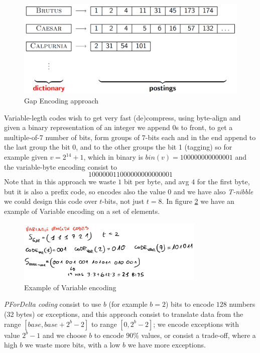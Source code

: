 \begin{figure}
	\includegraphics[width=\textwidth]{Images/gapEncoding}
	\caption{Gap Encoding approach}
	\label{img:gapEncoding}
\end{figure}
Variable-legth codes wish to get very fast (de)compress, 
using byte-align and given a binary representation of an integer
we append $0$s to front, to get a multiple-of-7 number of bits,
form groups of $7$-bits each and in the end append to the last group
the bit 0, and to the other groups the bit 1 (tagging) so for 
example given $v=2^{14} + 1$, which in binary is $bin(v) = 100000000000001$
and the variable-byte encoding consist to 
\[ 10000001 10000000 00000001 \]
Note that in this approach we waste $1$ bit per byte, and avg $4$
for the first byte, but it is also a prefix code, so encodes
also the value $0$ and we have also \emph{T-nibble} we could design
this code over $t$-bits, not just $t = 8$.\newline
In figure \ref{img:variable} we have an example of Variable encoding on a set of elements.

\begin{figure}
	\includegraphics[width=0.8\textwidth]{Images/variableCode}
	\caption{Example of Variable encoding}
	\label{img:variable}
\end{figure}

\emph{PForDelta coding} consist to use $b$ (for example $b = 2$) bits 
to encode $128$ numbers ($32$ bytes) or exceptions, and this approach
consist to translate data from the range $[base, base + 2^b - 2]$ to 
range $[0, 2^b - 2]$; we encode exceptions with value $2^b - 1$ and we 
choose $b$ to encode $90\%$ values, or consist a trade-off, where 
a high $b$ we waste more bits, with a low $b$ we have more exceptions.

